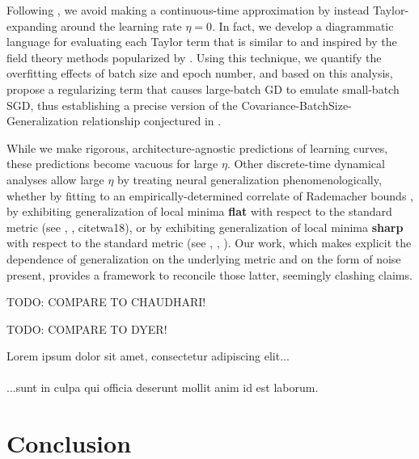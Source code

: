 \documentclass{article}
\newcommand{\sdia}[1]{\begin{gathered}\texttt{[image: ../diagrams/\#1.png]}\end{gathered}}
\newcommand{\lorem}[1]{
    Lorem ipsum dolor sit amet, consectetur adipiscing elit...\\
    \nopagebreak\vspace{#1cm} \ \\
    ...sunt in culpa qui officia deserunt mollit anim id est laborum.
}
\begin{document}
    Following \citet{ro18}, we avoid making a continuous-time approximation by
    instead Taylor-expanding around the learning rate $\eta=0$.  In fact, we
    develop a diagrammatic language for evaluating each Taylor term that is
    similar to and inspired by the field theory methods popularized by
    \citet{dy49a}.  Using this technique, we quantify the overfitting effects
    of batch size and epoch number, and based on this analysis, propose a
    regularizing term that causes large-batch GD to emulate small-batch SGD,
    thus establishing a precise version of the
    Covariance-BatchSize-Generalization relationship conjectured in
    \citet{ja18}.  
    
    While we make rigorous, architecture-agnostic predictions of learning
    curves, these predictions become vacuous for large $\eta$.  Other
    discrete-time dynamical analyses allow large $\eta$ by treating neural
    generalization phenomenologically, whether by fitting to an
    empirically-determined correlate of Rademacher bounds \citep{li18}, by
    exhibiting generalization of local minima {\bf flat} with respect to the
    standard metric (see \citet{ho17}, \citet{ke17}, citet{wa18}), or by
    exhibiting generalization of local minima {\bf sharp} with respect to the
    standard metric (see \citet{st56}, \citet{di17}, \citet{wu18}).  Our work,
    which makes explicit the dependence of generalization on the underlying
    metric and on the form of noise present, provides a framework to reconcile
    those latter, seemingly clashing claims.
    
    {\color{red} TODO: COMPARE TO CHAUDHARI!}
    
    {\color{red} TODO: COMPARE TO DYER!}

    \lorem{5}


\section{Conclusion}

    
\end{document}
